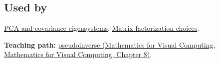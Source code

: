 \subsection{Used by}\label{appendix-541306fdbc1b-used-by}

\hyperref[appendix-ad175ef3c5bf]{PCA and covariance eigensystems}, \hyperref[appendix-221a483bec2d]{Matrix factorization choices}.

\textbf{Teaching path:} \href{../02-Mathematics-for-Visual-Computing/main.pdf\#nameddest=02-foundations-ii-ch024-pseudoinverse-makes-least-squares-and-minimum-norm-one-operation}{pseudoinverse (Mathematics for Visual Computing, Mathematics for Visual Computing, Chapter 8)}.
